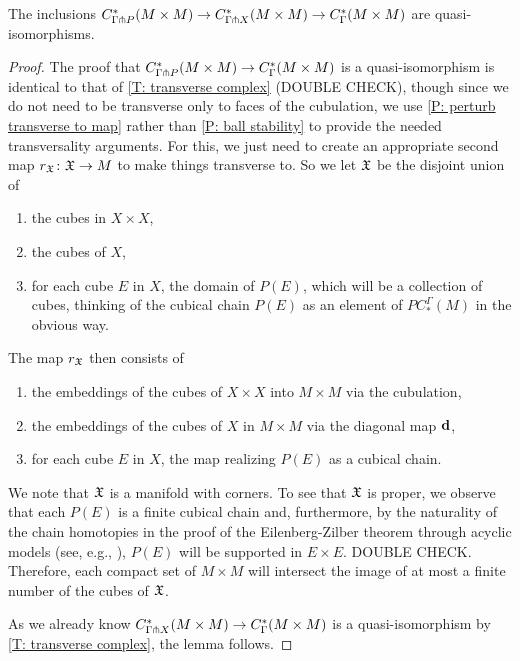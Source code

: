 \documentclass{amsart}
\begin{document}
\begin{lemma}\label{L: P-transverse iso}
	The inclusions $C^*_{\Gamma \pitchfork P} (M \times M) \to C^*_{\Gamma \pitchfork X} (M \times M) \to C^*_\Gamma (M \times M)$ are quasi-isomorphisms.
\end{lemma}
\begin{proof}
	The proof that $C^*_{\Gamma \pitchfork P} (M \times M)  \to C^*_\Gamma (M \times M)$ is a quasi-isomorphism is identical to that of \cref{T: transverse complex} (DOUBLE CHECK), though since we do not need to be transverse only to faces of the cubulation, we use \cref{P: perturb transverse to map} rather than \cref{P: ball stability} to provide the needed transversality arguments.
	For this, we just need to create an appropriate second map $r_{\mathfrak X}  \colon \mathfrak X \to M$ to make things transverse to.
	So we let $\mathfrak X$ be the disjoint union of
	\begin{enumerate}
		\item the cubes in $X \times X$,
		\item the cubes of $X$,
		\item for each cube $E$ in $X$, the domain of $P(E)$, which will be a collection of cubes, thinking of the cubical chain $P(E)$ as an element of $PC^\Gamma_*(M)$ in the obvious way.
	\end{enumerate}
	The map $r_{\mathfrak X}$ then consists of
	\begin{enumerate}
		\item the embeddings of the cubes of $X \times X$ into $M \times M$ via the cubulation,
		\item the embeddings of the cubes of $X$ in $M \times M$ via the diagonal map $\mathbf{d}$,
		\item for each cube $E$ in $X$, the map realizing $P(E)$ as a cubical chain.
	\end{enumerate}
	We note that $\mathfrak X$ is a manifold with corners.
	To see that $\mathfrak X$ is proper, we observe that each $P(E)$ is a finite cubical chain and, furthermore, by the naturality of the chain homotopies in the proof of the Eilenberg-Zilber theorem through acyclic models (see, e.g., \cite[Section XI.5]{Mas91}), $P(E)$ will be supported in $E \times E$. DOUBLE CHECK.
	Therefore, each compact set of $M \times M$ will intersect the image of at most a finite number of the cubes of $\mathfrak X$.

	As we already know $C^*_{\Gamma \pitchfork X} (M \times M) \to C^*_\Gamma (M \times M)$ is a quasi-isomorphism by \cref{T: transverse complex}, the lemma follows.
\end{proof}
\end{document}
